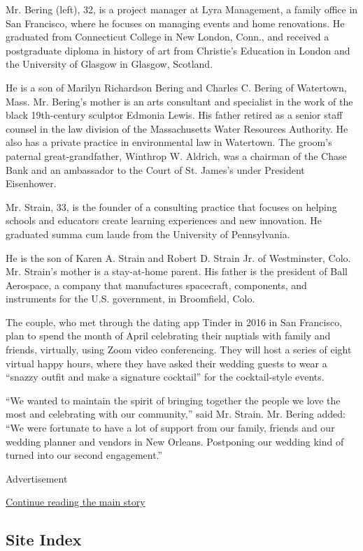 Mr. Bering (left), 32, is a project manager at Lyra Management, a family
office in San Francisco, where he focuses on managing events and home
renovations. He graduated from Connecticut College in New London, Conn.,
and received a postgraduate diploma in history of art from Christie's
Education in London and the University of Glasgow in Glasgow, Scotland.

He is a son of Marilyn Richardson Bering and Charles C. Bering of
Watertown, Mass. Mr. Bering's mother is an arts consultant and
specialist in the work of the black 19th-century sculptor Edmonia Lewis.
His father retired as a senior staff counsel in the law division of the
Massachusetts Water Resources Authority. He also has a private practice
in environmental law in Watertown. The groom's paternal
great-grandfather, Winthrop W. Aldrich, was a chairman of the Chase Bank
and an ambassador to the Court of St. James's under President
Eisenhower.

Mr. Strain, 33, is the founder of a consulting practice that focuses on
helping schools and educators create learning experiences and new
innovation. He graduated summa cum laude from the University of
Pennsylvania.

He is the son of Karen A. Strain and Robert D. Strain Jr. of
Westminster, Colo. Mr. Strain's mother is a stay-at-home parent. His
father is the president of Ball Aerospace, a company that manufactures
spacecraft, components, and instruments for the U.S. government, in
Broomfield, Colo.

The couple, who met through the dating app Tinder in 2016 in San
Francisco, plan to spend the month of April celebrating their nuptials
with family and friends, virtually, using Zoom video conferencing. They
will host a series of eight virtual happy hours, where they have asked
their wedding guests to wear a ``snazzy outfit and make a signature
cocktail'' for the cocktail-style events.

``We wanted to maintain the spirit of bringing together the people we
love the most and celebrating with our community,'' said Mr. Strain. Mr.
Bering added: ``We were fortunate to have a lot of support from our
family, friends and our wedding planner and vendors in New Orleans.
Postponing our wedding kind of turned into our second engagement.''

Advertisement

\protect\hyperlink{after-bottom}{Continue reading the main story}

\hypertarget{site-index}{%
\subsection{Site Index}\label{site-index}}

